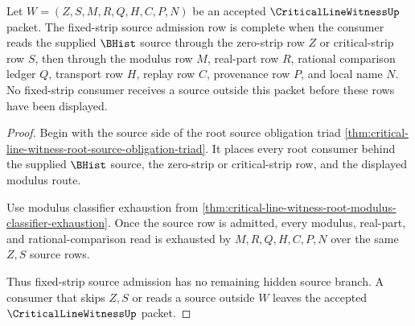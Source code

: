 \begin{theorem}
\label{thm:critical-line-witness-fixed-strip-source-admission-completion}
Let $W=(Z,S,M,R,Q,H,C,P,N)$ be an accepted $\CriticalLineWitnessUp$ packet. The fixed-strip source admission row is complete when the consumer reads the supplied $\BHist$ source through the zero-strip row $Z$ or critical-strip row $S$, then through the modulus row $M$, real-part row $R$, rational comparison ledger $Q$, transport row $H$, replay row $C$, provenance row $P$, and local name $N$. No fixed-strip consumer receives a source outside this packet before these rows have been displayed.
\end{theorem}
\begin{proof}
Begin with the source side of the root source obligation triad \autoref{thm:critical-line-witness-root-source-obligation-triad}. It places every root consumer behind the supplied $\BHist$ source, the zero-strip or critical-strip row, and the displayed modulus route.

Use modulus classifier exhaustion from \autoref{thm:critical-line-witness-root-modulus-classifier-exhaustion}. Once the source row is admitted, every modulus, real-part, and rational-comparison read is exhausted by $M,R,Q,H,C,P,N$ over the same $Z,S$ source rows.

Thus fixed-strip source admission has no remaining hidden source branch. A consumer that skips $Z,S$ or reads a source outside $W$ leaves the accepted $\CriticalLineWitnessUp$ packet.
\end{proof}

